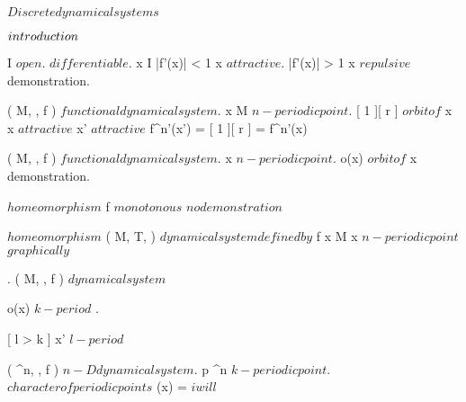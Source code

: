 \documentclass[../Main/main]{subfiles}
\begin{document}
\unit{ $ Discrete dynamical systems $ }
{
	\introduction
	{ 
		$introduction\\$ 
	}

	{
		{
			I \subset \R $ open $.
			 $ differentiable $.
			x \in I
		}
		\holds
		{
			|f'(x)| < 1 \imp x $ attractive $.
			|f'(x)| > 1 \imp x $ repulsive $
		}
		\demonstration
		{
			demonstration.
		}
	}
	
	
	{
		{
			( M, \N, f ) $ functional dynamical system $.
			x \in M $ n-periodic point $.
			[ 1 ][ r ] $ orbit of $ x
		}
		\holds
		{
			x $ attractive $ \ifandonlyif {}
			{
				x' $ attractive $
			}
		}
		\demonstration
		{
			{
				f^{n'}(x') = [ 1 ][ r ] = f^{n'}(x)
			}
		}
	}


	{
		{
			( M, \N, f ) $ functional dynamical system $.
			x $ n-periodic point $.
			o(x) $ orbit of $ x
		}
		\holds
		{
			{
			}
		}
		\demonstration
		{
			demonstration.
		}
	}
	
	
	{
		{
			 $ homeomorphism $
		}
		\holds
		{
			f $ monotonous $
		}
		\demonstration
		{
			$ no demonstration $
		}
	}


	{
		{
			 $ homeomorphism $
			( M, T, \phi ) $ dynamical system defined by $ f
		}
		\holds
		{
			{
				\nexists \; x \in M \suchthat x $ n-periodic point $
			}
		}
		\demonstration
		{
			$graphically $
		}
	}


	{
		{
			.
			( M, \N, f ) $ dynamical system $
		}
		\holds
		{
			{
				o(x) $ k-period $
			}.

			\imp {}
			{
				{
					x' $ l-period $
				}
			}
		}
	}


	

	{
		{
			( \R^n, \N, f ) $ n-D dynamical system $.
			p \in \R^n $ k-periodic point $.
			\chi $ character of periodic points $
		}	
		\holds
		{
			\ex{ \sigma \in \im( \chi ) }
			{
				{
					\chi(x) = \sigma
				}
			}
		}
		\demonstration
		{
			$ i will $
		}
	}
	

}
\end{document}
